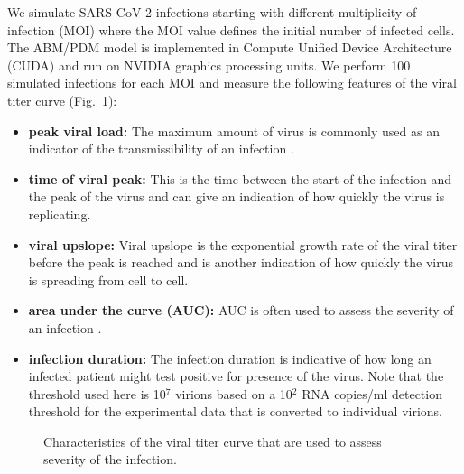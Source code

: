 We simulate SARS-CoV-2 infections starting with different multiplicity of infection (MOI) where the MOI value defines the initial number of infected cells. The ABM/PDM model is implemented in Compute Unified Device Architecture (CUDA) and run on NVIDIA graphics processing units. We perform 100 simulated infections for each MOI and measure the following features of the viral titer curve (Fig.\ \ref{measurements}): 
\begin{itemize}
\item \textbf{peak viral load:} The maximum amount of virus is commonly used as an indicator of the transmissibility of an infection \citep{handel09}. 
\item \textbf{time of viral peak:} This is the time between the start of the infection and the peak of the virus and can give an indication of how quickly the virus is replicating.
\item \textbf{viral upslope:} Viral upslope is the exponential growth rate of the viral titer before the peak is reached and is another indication of how quickly the virus is spreading from cell to cell. 
\item \textbf{area under the curve (AUC):} AUC is often used to assess the severity of an infection \citep{hayden00, barroso05}.
\item \textbf{infection duration:} The infection duration is indicative of how long an infected patient might test positive for presence of the virus. Note that the threshold used here is 10$^7$ virions based on a 10$^2$ RNA copies/ml detection threshold for the experimental data \cite{goncalves20} that is converted to individual virions.
\end{itemize}
\begin{figure}[!h]

\begin{center}
\caption{Characteristics of the viral titer curve that are used to assess severity of the infection.\label{measurements}}
\end{center}
\end{figure}

